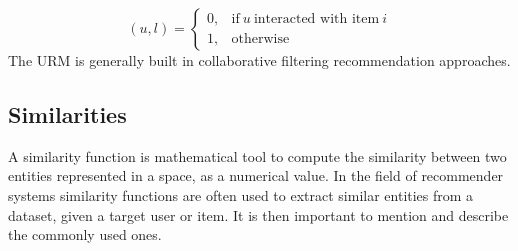 \begin{itemize}
\begin{equation*}
(u,l)=
\begin{cases}
0, & \text{if}\ u\ \text{interacted with item}\ i\\
1, & \text{otherwise}
\end{cases}
\end{equation*}
The URM is generally built in collaborative filtering recommendation approaches.
\end{itemize}


\subsection{Similarities}

A similarity function is mathematical tool to compute the similarity between two entities represented in a space, as a numerical value. In the field of recommender systems similarity functions are often used to extract similar entities from a dataset, given a target user or item. It is then important to mention and describe the commonly used ones.
